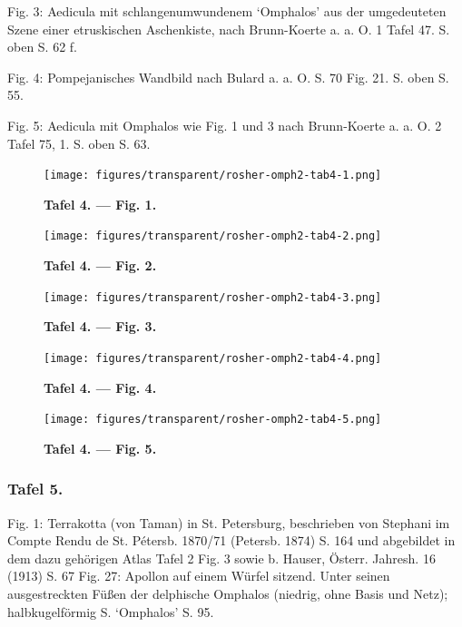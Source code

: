 \documentclass[a4paper, 11pt, oneside]{article}
\begin{document}
Fig. 3: Aedicula mit schlangenumwundenem `Omphalos' aus der umgedeuteten Szene einer etruskischen Aschenkiste, nach Brunn-Koerte a. a. O. 1 Tafel 47. S. oben S. 62 f.

Fig. 4: Pompejanisches Wandbild nach Bulard a. a. O. S. 70 Fig. 21. S. oben S. 55.

Fig. 5: Aedicula mit Omphalos wie Fig. 1 und 3 nach Brunn-Koerte a. a. O. 2 Tafel 75, 1. S. oben S. 63.
\clearpage
\vspace*{\fill}
\begin{figure}[H]
\centering
\texttt{[image: figures/transparent/rosher-omph2-tab4-1.png]}
\caption{\bfseries Tafel 4. --- Fig. 1.}
\end{figure}
\vspace*{\fill}
\clearpage
\vspace*{\fill}
\begin{figure}[H]
\centering
\texttt{[image: figures/transparent/rosher-omph2-tab4-2.png]}
\caption{\bfseries Tafel 4. --- Fig. 2.}
\end{figure}
\vspace*{\fill}
\clearpage
\vspace*{\fill}
\begin{figure}[H]
\centering
\texttt{[image: figures/transparent/rosher-omph2-tab4-3.png]}
\caption{\bfseries Tafel 4. --- Fig. 3.}
\end{figure}
\vspace*{\fill}
\clearpage
\vspace*{\fill}
\begin{figure}[H]
\centering
\texttt{[image: figures/transparent/rosher-omph2-tab4-4.png]}
\caption{\bfseries Tafel 4. --- Fig. 4.}
\end{figure}
\vspace*{\fill}
\clearpage
\vspace*{\fill}
\begin{figure}[H]
\centering
\texttt{[image: figures/transparent/rosher-omph2-tab4-5.png]}
\caption{\bfseries Tafel 4. --- Fig. 5.}
\end{figure}
\vspace*{\fill}
\clearpage
\subsubsection{Tafel 5.}

Fig. 1: Terrakotta (von Taman) in St. Petersburg, beschrieben von Stephani im Compte Rendu de St. Pétersb. 1870/71 (Petersb. 1874) S. 164 und abgebildet in dem dazu gehörigen Atlas Tafel 2 Fig. 3 sowie b. Hauser, Österr. Jahresh. 16 (1913) S. 67 Fig. 27: Apollon auf einem Würfel sitzend. Unter seinen ausgestreckten Füßen der delphische Omphalos (niedrig, ohne Basis und Netz); halbkugelförmig S. `Omphalos' S. 95.
\end{document}
